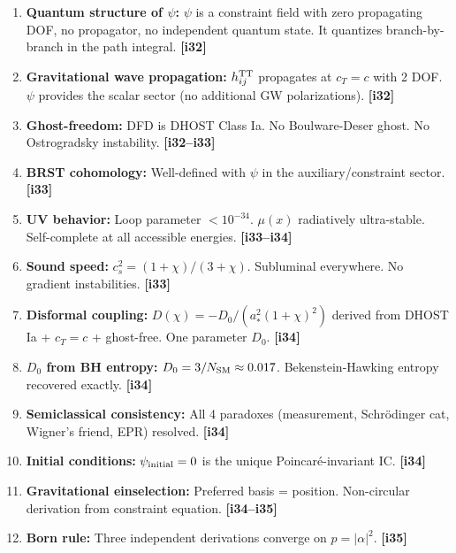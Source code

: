 \documentclass[11pt,a4paper]{article}
\begin{document}
\begin{enumerate}
\item \textbf{Quantum structure of $\psi$:} $\psi$ is a constraint field with zero propagating DOF, no propagator, no independent quantum state. It quantizes branch-by-branch in the path integral. \textbf{[i32]}

\item \textbf{Gravitational wave propagation:} $h_{ij}^{\rm TT}$ propagates at $c_T = c$ with 2 DOF. $\psi$ provides the scalar sector (no additional GW polarizations). \textbf{[i32]}

\item \textbf{Ghost-freedom:} DFD is DHOST Class Ia. No Boulware-Deser ghost. No Ostrogradsky instability. \textbf{[i32--i33]}

\item \textbf{BRST cohomology:} Well-defined with $\psi$ in the auxiliary/constraint sector. \textbf{[i33]}

\item \textbf{UV behavior:} Loop parameter $< 10^{-34}$. $\mu(x)$ radiatively ultra-stable. Self-complete at all accessible energies. \textbf{[i33--i34]}

\item \textbf{Sound speed:} $c_s^2 = (1+\chi)/(3+\chi)$. Subluminal everywhere. No gradient instabilities. \textbf{[i33]}

\item \textbf{Disformal coupling:} $D(\chi) = -D_0/(a_*^2(1+\chi)^2)$ derived from DHOST Ia + $c_T = c$ + ghost-free. One parameter $D_0$. \textbf{[i34]}

\item \textbf{$D_0$ from BH entropy:} $D_0 = 3/N_{\rm SM} \approx 0.017$. Bekenstein-Hawking entropy recovered exactly. \textbf{[i34]}

\item \textbf{Semiclassical consistency:} All 4 paradoxes (measurement, Schr\"odinger cat, Wigner's friend, EPR) resolved. \textbf{[i34]}

\item \textbf{Initial conditions:} $\psi_{\rm initial} = 0$ is the unique Poincar\'e-invariant IC. \textbf{[i34]}

\item \textbf{Gravitational einselection:} Preferred basis = position. Non-circular derivation from constraint equation. \textbf{[i34--i35]}

\item \textbf{Born rule:} Three independent derivations converge on $p = |\alpha|^2$. \textbf{[i35]}


\end{enumerate}
\end{document}
